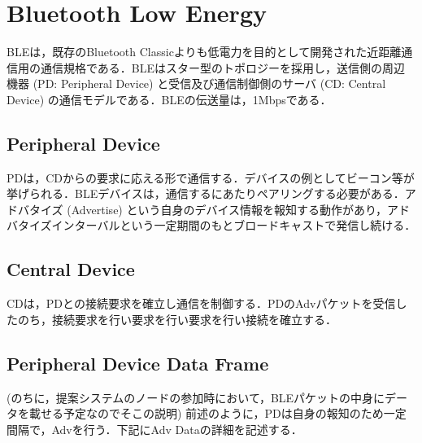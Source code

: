 \section{Bluetooth Low Energy}
BLEは，既存のBluetooth Classicよりも低電力を目的として開発された近距離通信用の通信規格である．BLEはスター型のトポロジーを採用し，送信側の周辺機器 (PD: Peripheral Device) と受信及び通信制御側のサーバ (CD: Central Device) の通信モデルである．BLEの伝送量は，1Mbpsである．

\subsection{Peripheral Device}
PDは，CDからの要求に応える形で通信する．デバイスの例としてビーコン等が挙げられる．BLEデバイスは，通信するにあたりペアリングする必要がある．アドバタイズ (Advertise) という自身のデバイス情報を報知する動作があり，アドバタイズインターバルという一定期間のもとブロードキャストで発信し続ける．

\subsection{Central Device}
CDは，PDとの接続要求を確立し通信を制御する．PDのAdvパケットを受信したのち，接続要求を行い要求を行い要求を行い接続を確立する．

\subsection{Peripheral Device Data Frame}
(のちに，提案システムのノードの参加時において，BLEパケットの中身にデータを載せる予定なのでそこの説明)
前述のように，PDは自身の報知のため一定間隔で，Advを行う．下記にAdv Dataの詳細を記述する．